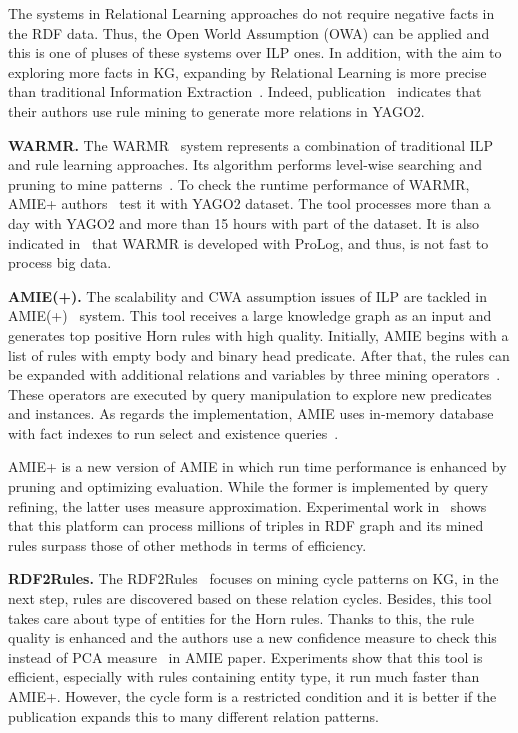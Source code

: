 The systems in Relational Learning approaches do not require negative facts in the RDF data. Thus, the Open World Assumption (OWA) can be applied and this is one of pluses of these systems over ILP ones. In addition, with the aim to exploring more facts in KG, expanding by Relational Learning is more precise than traditional Information Extraction~\cite{ref29}. Indeed, publication~\cite{ref30} indicates that their authors use rule mining to generate more relations in YAGO2.

\textbf{WARMR.} The WARMR~\cite{ref16, ref17} system represents a combination of traditional ILP and rule learning approaches. Its algorithm performs level-wise searching and pruning to mine patterns~\cite{ref10}. To check the runtime performance of WARMR, AMIE+ authors~\cite{ref10} test it with YAGO2 dataset. The tool processes more than a day with YAGO2 and more than 15 hours with part of the dataset. It is also indicated in~\cite{ref10} that WARMR is developed with ProLog, and thus, is not fast to process big data.

\textbf{AMIE(+).} The scalability and CWA assumption issues of ILP are tackled in AMIE(+)~\cite{ref10} system. This tool receives a large knowledge graph as an input and generates top positive Horn rules with high quality. Initially, AMIE begins with a list of rules with empty body and binary head predicate. After that, the rules can be expanded with additional relations and variables by three mining operators~\cite{ref10}. These operators are executed by query manipulation to explore new predicates and instances. As regards the implementation, AMIE uses in-memory database with fact indexes to run select and existence queries~\cite{ref10}.

AMIE+ is a new version of AMIE in which run time performance is enhanced by pruning and optimizing evaluation. While the former is implemented by query refining, the latter uses measure approximation. Experimental work in~\cite{ref10} shows that this platform can process millions of triples in RDF graph and its mined rules surpass those of other methods in terms of efficiency.

\textbf{RDF2Rules.} The RDF2Rules~\cite{ref29} focuses on mining cycle patterns on KG, in the next step, rules are discovered based on these relation cycles. Besides, this tool takes care about type of entities for the Horn rules. Thanks to this, the rule quality is enhanced and the authors use a new confidence measure to check this instead of PCA measure~\cite{ref10} in AMIE paper. Experiments show that this tool is efficient, especially with rules containing entity type, it run much faster than AMIE+. However, the cycle form is a restricted condition and it is better if the publication expands this to many different relation patterns.

